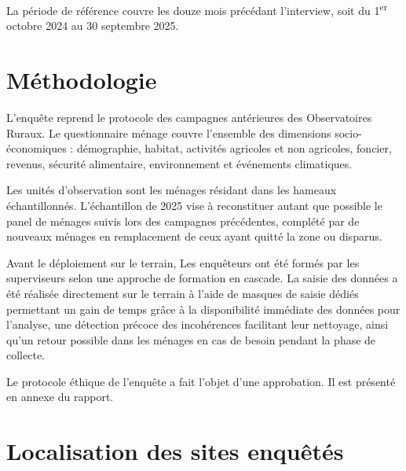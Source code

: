 \documentclass[
  french,
  letterpaper,
]{report}
\begin{document}
La période de référence couvre les douze mois précédant l'interview,
soit du 1\textsuperscript{er} octobre 2024 au 30 septembre 2025.

\section{Méthodologie}\label{muxe9thodologie}

L'enquête reprend le protocole des campagnes antérieures des
Observatoires Ruraux. Le questionnaire ménage couvre l'ensemble des
dimensions socio-économiques : démographie, habitat, activités agricoles
et non agricoles, foncier, revenus, sécurité alimentaire, environnement
et événements climatiques.

Les unités d'observation sont les ménages résidant dans les hameaux
échantillonnés. L'échantillon de 2025 vise à reconstituer autant que
possible le panel de ménages suivis lors des campagnes précédentes,
complété par de nouveaux ménages en remplacement de ceux ayant quitté la
zone ou disparus.

Avant le déploiement sur le terrain, Les enquêteurs ont été formés par
les superviseurs selon une approche de formation en cascade. La saisie
des données a été réalisée directement sur le terrain à l'aide de
masques de saisie dédiés permettant un gain de temps grâce à la
disponibilité immédiate des données pour l'analyse, une détection
précoce des incohérences facilitant leur nettoyage, ainsi qu'un retour
possible dans les ménages en cas de besoin pendant la phase de collecte.

\begin{tcolorbox}[enhanced jigsaw, arc=.35mm, bottomrule=.15mm, bottomtitle=1mm, breakable, colback=white, colbacktitle=quarto-callout-note-color!10!white, colframe=quarto-callout-note-color-frame, coltitle=black, left=2mm, leftrule=.75mm, opacityback=0, opacitybacktitle=0.6, rightrule=.15mm, title=\textcolor{quarto-callout-note-color}{\faInfo}\hspace{0.5em}{Note}, titlerule=0mm, toprule=.15mm, toptitle=1mm]

Le protocole éthique de l'enquête a fait l'objet d'une approbation. Il
est présenté en annexe du rapport.

\end{tcolorbox}

\section{Localisation des sites
enquêtés}\label{localisation-des-sites-enquuxeatuxe9s}
\end{document}
